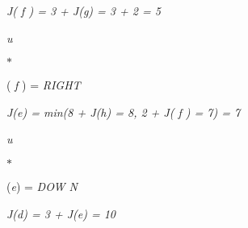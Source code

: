 \documentclass[12pt,twoside]{article}
\begin{document}
\vspace{\baselineskip}
\begin{adjustwidth}{0.51in}{1.09in}
{\fontsize{10pt}{12.0pt}\selectfont \textit{J( f ) = 3 + J(g) = 3 + 2 = 5}\par}\par

\end{adjustwidth}

\begin{adjustwidth}{2.35in}{0.0in}
\begin{FlushLeft}
{\fontsize{10pt}{12.0pt}\selectfont \textit{u}{\fontsize{7pt}{8.4pt}\selectfont $\ast$  {\fontsize{10pt}{12.0pt}\selectfont ( \textit{f }) = \textit{RIGHT}\par}\par}\par}
\end{FlushLeft}\par

\end{adjustwidth}


\vspace{\baselineskip}
\begin{adjustwidth}{2.46in}{0.0in}
{\fontsize{10pt}{12.0pt}\selectfont \textit{J(e) = min(8 + J(h) = 8, 2 + J( f ) = 7) = 7}\par}\par

\end{adjustwidth}

\begin{adjustwidth}{2.37in}{0.0in}
\begin{FlushLeft}
{\fontsize{10pt}{12.0pt}\selectfont \textit{u}{\fontsize{7pt}{8.4pt}\selectfont $\ast$  {\fontsize{10pt}{12.0pt}\selectfont (\textit{e}) = \textit{DOW N}\par}\par}\par}
\end{FlushLeft}\par

\end{adjustwidth}


\vspace{\baselineskip}
\begin{adjustwidth}{0.07in}{1.09in}
{\fontsize{10pt}{12.0pt}\selectfont \textit{J(d) = 3 + J(e) = 10}\par}\par

\end{adjustwidth}
\end{document}
